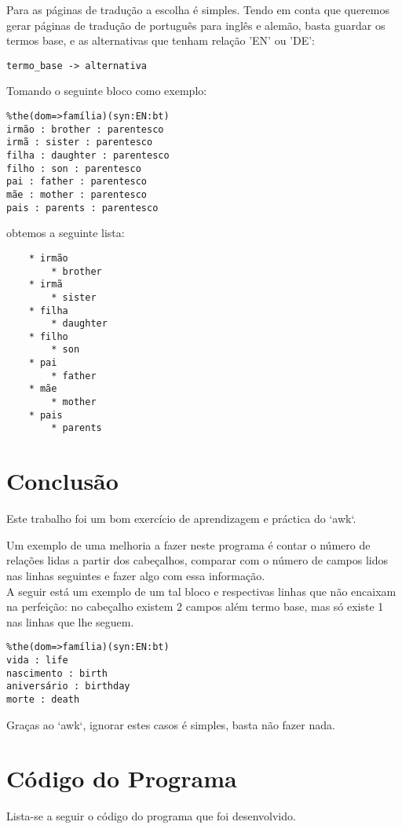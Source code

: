 \documentclass{report}
\begin{document}
Para as páginas de tradução a escolha é simples. Tendo em conta que queremos gerar páginas de tradução de português para inglês e alemão, basta guardar os termos base, e as alternativas que tenham relação 'EN' ou 'DE':

\begin{verbatim}
termo_base -> alternativa
\end{verbatim}

Tomando o seguinte bloco como exemplo:

\begin{verbatim}
%the(dom=>família)(syn:EN:bt)
irmão : brother : parentesco
irmã : sister : parentesco
filha : daughter : parentesco
filho : son : parentesco
pai : father : parentesco
mãe : mother : parentesco
pais : parents : parentesco
\end{verbatim}

obtemos a seguinte lista:

\begin{verbatim}
    * irmão
        * brother
    * irmã
        * sister
    * filha
        * daughter
    * filho
        * son
    * pai
        * father
    * mãe
        * mother
    * pais
        * parents
\end{verbatim}

\chapter{Conclusão} \label{concl}
Este trabalho foi um bom exercício de aprendizagem e práctica do `awk`.

Um exemplo de uma melhoria a fazer neste programa é contar o número de relações lidas a partir dos cabeçalhos, comparar com o número de campos lidos nas linhas seguintes e fazer algo com essa informação.\\
A seguir está um exemplo de um tal bloco e respectivas linhas que não encaixam na perfeição: no cabeçalho existem 2 campos além termo base, mas só existe 1 nas linhas que lhe seguem.

\begin{verbatim}
%the(dom=>família)(syn:EN:bt)
vida : life
nascimento : birth
aniversário : birthday
morte : death
\end{verbatim}

Graças ao `awk`, ignorar estes casos é simples, basta não fazer nada.

\appendix
\chapter{Código do Programa}

Lista-se a seguir o código do programa que foi desenvolvido.




\end{document}
